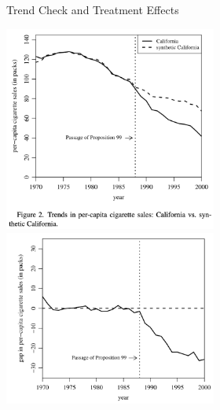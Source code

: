 \documentclass[xcolor=pdftex,dvipsnames,table,mathserif,aspectratio=169]{beamer}
\begin{document}
\begin{frame}{Trend Check and Treatment Effects}
\begin{center}
\includegraphics[width=2.75in]{./resources/abadie_3.png}
\includegraphics[width=2.75in]{./resources/abadie_4.png}
\end{center}
\end{frame}
\end{document}
